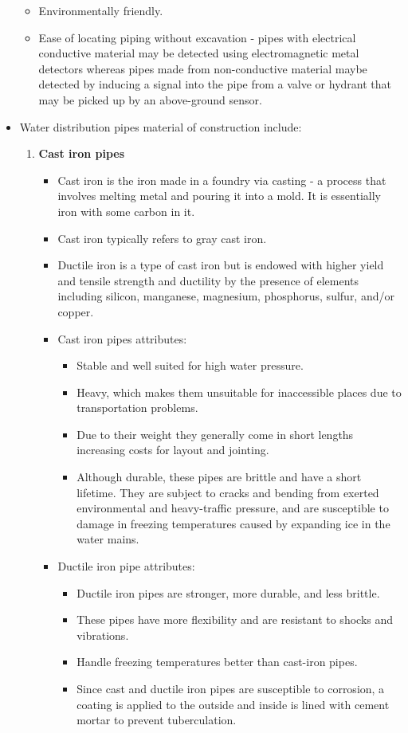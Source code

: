 \begin{itemize}
\begin{itemize}
\item Environmentally friendly.
\item Ease of locating piping without excavation - pipes with electrical conductive material may be detected using electromagnetic metal detectors whereas pipes made from non-conductive material maybe detected by inducing a signal into the pipe from a valve or hydrant that may be picked up by an above-ground sensor.
\end{itemize}
\item Water distribution pipes material of construction include:
\begin{enumerate}
\item \textbf{Cast iron pipes}
\begin{itemize}
\item Cast iron is the iron made in a foundry via casting - a process that involves melting metal and pouring it into a mold.  It is essentially iron with some carbon in it.  
\item Cast iron typically refers to gray cast iron.  
\item Ductile iron is a type of cast iron but is endowed with higher yield and tensile strength and ductility by the presence of elements including silicon, manganese, magnesium, phosphorus, sulfur, and/or copper.
\item Cast iron pipes attributes:
\begin{itemize}
\item Stable and well suited for high water pressure.
\item  Heavy, which makes them unsuitable for inaccessible places due to transportation problems. 
\item Due to their weight they generally come in short lengths increasing costs for layout and jointing. 
\item Although durable, these pipes are brittle and have a short lifetime. They are subject to cracks and bending from exerted environmental and heavy-traffic pressure, and are susceptible to damage in freezing temperatures caused by expanding ice in the water mains.  
\end{itemize}
\item Ductile iron pipe attributes:
\begin{itemize}
\item Ductile iron pipes are stronger, more durable, and less brittle. 
\item These pipes have more flexibility and are resistant to shocks and vibrations. 
\item Handle freezing temperatures better than cast-iron pipes.
\item Since cast and ductile iron pipes are susceptible to corrosion, a coating is applied to the outside and inside is lined with cement mortar to prevent tuberculation.
\end{itemize}
\end{itemize}


\end{enumerate}
\end{itemize}
